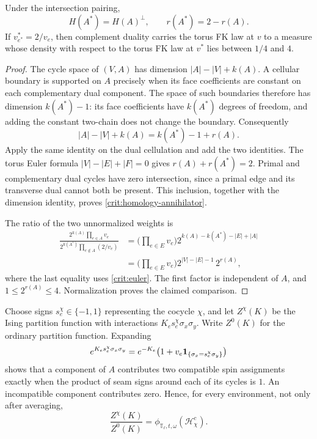\begin{lemma}\label{crit:torus-duality}
Under the intersection pairing,
\begin{equation}\label{crit:homology-annihilator}
 H(A^*)=H(A)^\perp,\qquad r(A^*)=2-r(A).
\end{equation}
If $v_{e^*}^*=2/v_e$, then complement duality carries the torus FK law
at $v$ to a measure whose density with respect to the torus FK law at
$v^*$ lies between $1/4$ and $4$.
\end{lemma}

\begin{proof}
The cycle space of $(V,A)$ has dimension $|A|-|V|+k(A)$.  A cellular
boundary is supported on $A$ precisely when its face coefficients are
constant on each complementary dual component.  The space of such
boundaries therefore has dimension $k(A^*)-1$: its face coefficients
have $k(A^*)$ degrees of freedom, and adding the constant two-chain
does not change the boundary.  Consequently
\begin{equation}\label{crit:euler}
 |A|-|V|+k(A)=k(A^*)-1+r(A).
\end{equation}
Apply the same identity on the dual cellulation and add the two
identities.  The torus Euler formula $|V|-|E|+|F|=0$ gives
$r(A)+r(A^*)=2$.  Primal and complementary dual cycles have zero
intersection, since a primal edge and its transverse dual cannot both
be present.  This inclusion, together with the dimension identity,
proves \eqref{crit:homology-annihilator}.

The ratio of the two unnormalized weights is
\begin{align*}
 \frac{2^{k(A)}\prod_{e\in A}v_e}
 {2^{k(A^*)}\prod_{e\notin A}(2/v_e)}
 &=\Big(\prod_{e\in E}v_e\Big)
            2^{k(A)-k(A^*)-|E|+|A|}\\
 &=\Big(\prod_{e\in E}v_e\Big)
            2^{|V|-|E|-1}\,2^{r(A)},
\end{align*}
where the last equality uses \eqref{crit:euler}.  The first factor is
independent of $A$, and $1\le2^{r(A)}\le4$.  Normalization proves the
claimed comparison.
\end{proof}

Choose signs $s_e^\chi\in\{-1,1\}$ representing the cocycle $\chi$,
and let $Z^\chi(K)$ be the Ising partition function with interactions
$K_es_e^\chi\sigma_x\sigma_y$.  Write $Z^0(K)$ for the ordinary
partition function.  Expanding
\[
 e^{K_es_e^\chi\sigma_x\sigma_y}
 =e^{-K_e}\bigl(1+v_e\mathbf 1_{\{\sigma_x=s_e^\chi\sigma_y\}}\bigr)
\]
shows that a component of $A$ contributes two compatible spin
assignments exactly when the product of seam signs around each of its
cycles is $1$.  An incompatible component contributes zero.  Hence,
for every environment, not only after averaging,
\begin{equation}\label{crit:twist-identity}
 \frac{Z^\chi(K)}{Z^0(K)}
          =\phi_{\mathbb T_\ell,t,\omega}(\mathcal H_\chi^c).
\end{equation}

